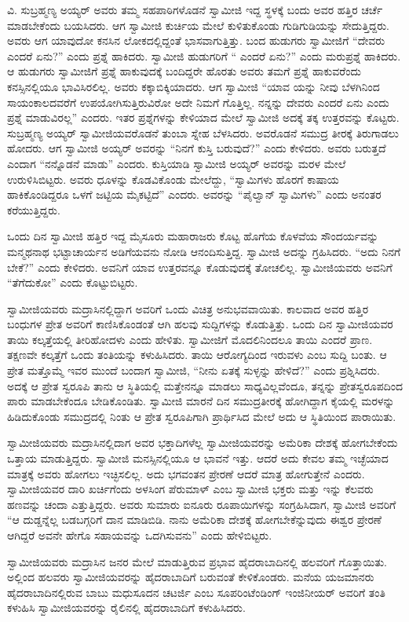  ವಿ. ಸುಬ್ರಹ್ಮಣ್ಯ ಅಯ್ಯರ್ ಅವರು ತಮ್ಮ ಸಹಪಾಠಿಗಳೊಡನೆ ಸ್ವಾಮೀಜಿ ಇದ್ದ ಸ್ಥಳಕ್ಕೆ ಬಂದು ಅವರ ಹತ್ತಿರ ಚರ್ಚೆ ಮಾಡಬೇಕೆಂದು ಬಯಸಿದರು. ಆಗ ಸ್ವಾಮೀಜಿ ಕುರ್ಚಿಯ ಮೇಲೆ ಕುಳಿತುಕೊಂಡು ಗುಡಿಗುಡಿಯನ್ನು ಸೇದುತ್ತಿದ್ದರು. ಅವರು ಆಗ ಯಾವುದೋ ಕನಸಿನ ಲೋಕದಲ್ಲಿದ್ದಂತೆ ಭಾಸವಾಗುತ್ತಿತ್ತು. ಬಂದ ಹುಡುಗರು ಸ್ವಾಮೀಜಿಗೆ “ದೇವರು ಎಂದರೆ ಏನು?” ಎಂದು ಪ್ರಶ್ನೆ ಹಾಕಿದರು. ಸ್ವಾಮೀಜಿ ಹುಡುಗರಿಗೆ “ ಎಂದರೆ ಏನು?” ಎಂದು ಮರುಪ್ರಶ್ನೆ ಹಾಕಿದರು. ಆ ಹುಡುಗರು ಸ್ವಾಮೀಜಿಗೆ ಪ್ರಶ್ನೆ ಹಾಕುವುದಕ್ಕೆ ಬಂದಿದ್ದರೇ ಹೊರತು ಅವರು ತಮಗೆ ಪ್ರಶ್ನೆ ಹಾಕುವರೆಂದು ಕನಸ್ಸಿನಲ್ಲಿಯೂ ಭಾವಿಸಿರಲಿಲ್ಲ. ಅವರು ಕಕ್ಕಾಬಿಕ್ಕಿಯಾದರು. ಆಗ ಸ್ವಾಮೀಜಿ “ಯಾವ ಯನ್ನು ನೀವು ಬೆಳಗಿನಿಂದ ಸಾಯಂಕಾಲದವರೆಗೆ ಉಪಯೋಗಿಸುತ್ತಿರುವಿರೋ ಅದೇ ನಿಮಗೆ ಗೊತ್ತಿಲ್ಲ. ನನ್ನನ್ನು ದೇವರು ಎಂದರೆ ಏನು ಎಂದು ಪ್ರಶ್ನೆ ಮಾಡುವಿರಲ್ಲ” ಎಂದರು. ಇತರ ಪ್ರಶ್ನೆಗಳನ್ನು ಕೇಳಿಯಾದ ಮೇಲೆ ಸ್ವಾಮೀಜಿ ಅದಕ್ಕೆ ತಕ್ಕ ಉತ್ತರವನ್ನು ಕೊಟ್ಟರು. ಸುಬ್ರಹ್ಮಣ್ಯ ಅಯ್ಯರ್ ಸ್ವಾಮೀಜಿಯವರೊಡನೆ ತುಂಬಾ ಸ್ನೇಹ ಬೆಳಸಿದರು. ಅವರೊಡನೆ ಸಮುದ್ರ ತೀರಕ್ಕೆ ತಿರುಗಾಡಲು ಹೋದರು. ಆಗ ಸ್ವಾಮೀಜಿ ಅಯ್ಯರ್ ಅವರನ್ನು “ನಿನಗೆ ಕುಸ್ತಿ ಬರುವುದೆ?” ಎಂದು ಕೇಳಿದರು. ಅವರು ಬರುತ್ತದೆ ಎಂದಾಗ “ನನ್ನೊಡನೆ ಮಾಡು” ಎಂದರು. ಕುಸ್ತಿಯಾಡಿ ಸ್ವಾಮೀಜಿ ಅಯ್ಯರ್ ಅವರನ್ನು ಮರಳ ಮೇಲೆ ಉರುಳಿಸಿಬಿಟ್ಟರು. ಅವರು ಧೂಳನ್ನು ಕೊಡವಿಕೊಂಡು ಮೇಲೆದ್ದು, “ಸ್ವಾಮಿಗಳು ಹೊರಗೆ ಕಾಷಾಯ ಹಾಕಿಕೊಂಡಿದ್ದರೂ ಒಳಗೆ ಜಟ್ಟಿಯ ಮೈಕಟ್ಟಿದೆ” ಎಂದರು. ಅವರನ್ನು “ಪೈಲ್ವಾನ್ ಸ್ವಾಮಿಗಳು” ಎಂದು ಅನಂತರ ಕರೆಯುತ್ತಿದ್ದರು.

 ಒಂದು ದಿನ ಸ್ವಾಮೀಜಿ ಹತ್ತಿರ ಇದ್ದ ಮೈಸೂರು ಮಹಾರಾಜರು ಕೊಟ್ಟ ಹೊಗೆಯ ಕೊಳವೆಯ ಸೌಂದರ್ಯವನ್ನು ಮನ್ಮಥನಾಥ ಭಟ್ಟಾಚಾರ್ಯನ ಅಡಿಗೆಯವನು ನೋಡಿ ಆನಂದಿಸುತ್ತಿದ್ದ. ಸ್ವಾಮೀಜಿ ಅದನ್ನು ಗ್ರಹಿಸಿದರು. “ಅದು ನಿನಗೆ ಬೇಕೆ?” ಎಂದು ಕೇಳಿದರು. ಅವನಿಗೆ ಯಾವ ಉತ್ತರವನ್ನೂ ಕೊಡುವುದಕ್ಕೆ ತೋಚಲಿಲ್ಲ. ಸ್ವಾಮೀಜಿಯವರು ಅವನಿಗೆ “ತೆಗೆದುಕೋ” ಎಂದು ಕೊಟ್ಟುಬಿಟ್ಟರು. 

 ಸ್ವಾಮೀಜಿಯವರು ಮದ್ರಾಸಿನಲ್ಲಿದ್ದಾಗ ಅವರಿಗೆ ಒಂದು ವಿಚಿತ್ರ ಅನುಭವವಾಯಿತು. ಕಾಲವಾದ ಅವರ ಹತ್ತಿರ ಬಂಧುಗಳ ಪ್ರೇತ ಅವರಿಗೆ ಕಾಣಿಸಿಕೊಂಡಂತೆ ಆಗಿ ಹಲವು ಸುದ್ದಿಗಳನ್ನು ಕೊಡುತ್ತಿತ್ತು. ಒಂದು ದಿನ ಸ್ವಾಮೀಜಿಯವರ ತಾಯಿ ಕಲ್ಕತ್ತೆಯಲ್ಲಿ ತೀರಿಹೋದಳು ಎಂದು ಹೇಳಿತು. ಸ್ವಾಮೀಜಿಗೆ ಮೊದಲಿನಿಂದಲೂ ತಾಯಿ ಎಂದರೆ ಪ್ರಾಣ. ತಕ್ಷಣವೇ ಕಲ್ಕತ್ತೆಗೆ ಒಂದು ತಂತಿಯನ್ನು ಕಳುಹಿಸಿದರು. ತಾಯಿ ಆರೋಗ್ಯದಿಂದ ಇರುವಳು ಎಂಬ ಸುದ್ದಿ ಬಂತು. ಆ ಪ್ರೇತ ಮತ್ತೊಮ್ಮೆ ಇವರ ಮುಂದೆ ಬಂದಾಗ ಸ್ವಾಮೀಜಿ, “ನೀನು ಏತಕ್ಕೆ ಸುಳ್ಳನ್ನು ಹೇಳಿದೆ?” ಎಂದು ಪ್ರಶ್ನಿಸಿದರು. ಅದಕ್ಕೆ ಆ ಪ್ರೇತ ಸ್ವರೂಪಿ ತಾನು ಆ ಸ್ಥಿತಿಯಲ್ಲಿ ಮತ್ತೇನನ್ನೂ ಮಾಡಲು ಸಾಧ್ಯವಿಲ್ಲವೆಂದೂ, ತನ್ನನ್ನು ಪ್ರೇತಸ್ವರೂಪದಿಂದ ಪಾರು ಮಾಡಬೇಕೆಂದೂ ಬೇಡಿಕೊಂಡಿತು. ಸ್ವಾಮೀಜಿ ಮಾರನೆ ದಿನ ಸಮುದ್ರತೀರಕ್ಕೆ ಹೋಗಿದ್ದಾಗ ಕೈಯಲ್ಲಿ ಮರಳನ್ನು ಹಿಡಿದುಕೊಂಡು ಸಮುದ್ರದಲ್ಲಿ ನಿಂತು ಆ ಪ್ರೇತ ಸ್ವರೂಪಿಗಾಗಿ ಪ್ರಾರ್ಥಿಸಿದ ಮೇಲೆ ಅದು ಆ ಸ್ಥಿತಿಯಿಂದ ಪಾರಾಯಿತು. 

 ಸ್ವಾಮೀಜಿಯವರು ಮದ್ರಾಸಿನಲ್ಲಿದಾಗ ಅವರ ಭಕ್ತಾದಿಗಳೆಲ್ಲ ಸ್ವಾಮೀಜಿಯವರನ್ನು ಅಮೆರಿಕಾ ದೇಶಕ್ಕೆ ಹೋಗಬೇಕೆಂದು ಒತ್ತಾಯ ಮಾಡುತ್ತಿದ್ದರು. ಸ್ವಾಮೀಜಿ ಮನಸ್ಸಿನಲ್ಲಿಯೂ ಆ ಭಾವನೆ ಇತ್ತು. ಆದರೆ ಅದು ಕೇವಲ ತಮ್ಮ ಇಚ್ಛೆಯಾದ ಮಾತ್ರಕ್ಕೆ ಅವರು ಹೋಗಲು ಇಚ್ಛಿಸಲಿಲ್ಲ. ಅದು ಭಗವಂತನ ಪ್ರೇರಣೆ ಆದರೆ ಮಾತ್ರ ಹೋಗುತ್ತೇನೆ ಎಂದರು. ಸ್ವಾಮೀಜಿಯವರ ದಾರಿ ಖರ್ಚಿಗೆಂದು ಅಳಸಿಂಗ ಪೆರುಮಾಳ್ ಎಂಬ ಸ್ವಾಮೀಜಿ ಭಕ್ತರು ಮತ್ತು ಇನ್ನು ಕೆಲವರು ಹಣವನ್ನು ಚಂದಾ ಎತ್ತುತ್ತಿದ್ದರು. ಅವರು ಸುಮಾರು ಐನೂರು ರೂಪಾಯಿಗಳನ್ನು ಸಂಗ್ರಹಿಸಿದಾಗ, ಸ್ವಾಮೀಜಿ ಅವರಿಗೆ “ಆ ದುಡ್ಡನ್ನೆಲ್ಲ ಬಡಬಗ್ಗರಿಗೆ ದಾನ ಮಾಡಿಬಿಡಿ. ನಾನು ಅಮೆರಿಕಾ ದೇಶಕ್ಕೆ ಹೋಗಬೇಕೆನ್ನುವುದು ಈಶ್ವರ ಪ್ರೇರಣೆ ಆಗಿದ್ದರೆ ಅವನೇ ಹೇಗೊ ಸಹಾಯವನ್ನು ಒದಗಿಸುವನು” ಎಂದು ಹೇಳಿಬಿಟ್ಟರು. 

 ಸ್ವಾಮೀಜಿಯವರು ಮದ್ರಾಸಿನ ಜನರ ಮೇಲೆ ಮಾಡುತ್ತಿರುವ ಪ್ರಭಾವ ಹೈದರಾಬಾದಿನಲ್ಲಿ ಹಲವರಿಗೆ ಗೊತ್ತಾಯಿತು. ಅಲ್ಲಿಂದ ಹಲವರು ಸ್ವಾಮೀಜಿಯವರನ್ನು ಹೈದರಾಬಾದಿಗೆ ಬರುವಂತೆ ಕೇಳಿಕೊಂಡರು. ಮನೆಯ ಯಜಮಾನರು ಹೈದರಾಬಾದಿನಲ್ಲಿರುವ ಬಾಬು ಮಧುಸೂದನ ಚಟರ್ಜಿ ಎಂಬ ಸೂಪರಿಂಟೆಂಡಿಂಗ್ ಇಂಜಿನೀಯರ್ ಅವರಿಗೆ ತಂತಿ ಕಳುಹಿಸಿ ಸ್ವಾಮೀಜಿಯವರನ್ನು ರೈಲಿನಲ್ಲಿ ಹೈದರಾಬಾದಿಗೆ ಕಳುಹಿಸಿದರು. 

